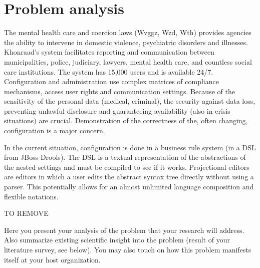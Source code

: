 \section{Problem analysis}

The mental health care and coercion laws (Wvggz, Wzd, Wth) provides agencies the ability to intervene in domestic violence, psychiatric disorders and illnesses.
Khonraad's system facilitates reporting and communication between municipalities, police, judiciary, lawyers, mental health care, and countless social care institutions.
The system has 15,000 users and is available 24/7. Configuration and administration use complex matrices of compliance mechanisms, access user rights and communication settings.
Because of the sensitivity of the personal data (medical, criminal), the security against data loss, preventing unlawful disclosure and guaranteeing availability (also in crisis situations) are crucial.
Demonstration of the correctness of the, often changing, configuration is a major concern. 

In the current situation, configuration is done in a business rule system (in a DSL from JBoss Drools).
The DSL is a textual representation of the abstractions of the nested settings and must be compiled to see if it works.
Projectional editors are editors in which a user edits the abstract syntax tree directly without using a parser.
This potentially allows for an almost unlimited language composition and flexible notations.


{\LARGE TO REMOVE}

Here you present your analysis of the problem that your research will address. 
Also summarize existing scientific insight into the problem (result of your literature survey, see below). 
You may also touch on how this problem manifests itself at your host organization.
